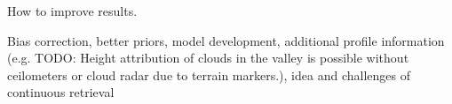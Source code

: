 \startsection[title=Conclusions]

\stopsection


\startsection[title=Future Work]

    How to improve results.

    Bias correction, better priors, model development, additional profile
    information (e.g. TODO: Height attribution of clouds in the valley is possible
    without ceilometers or cloud radar due to terrain markers.), idea and challenges of continuous retrieval



\stopsection

